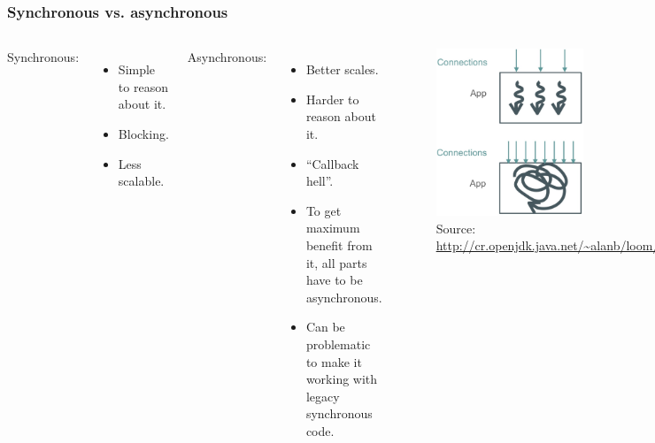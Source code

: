 \documentclass[10pt,utf8]{beamer}
\begin{document}
\begin{frame}
  \frametitle{Synchronous vs. asynchronous}
  \begin{columns}
            Synchronous:
            \begin{itemize}
                \item Simple to reason about it.
                \item Blocking.
                \item Less scalable.
            \end{itemize}
            
            \vspace{0.5cm}
            
            Asynchronous:
            \begin{itemize}
                \item Better scales.
                \item Harder to reason about it.
                \item ``Callback hell''.
                \item To get maximum benefit from it, all parts have to be asynchronous.
                \item Can be problematic to make it working with legacy synchronous code.
            \end{itemize}
            
            \begin{figure}
                \centering
                \includegraphics[height=5cm]{./img/sync_vs_async.eps}
                \caption{\tiny{Source: \url{http://cr.openjdk.java.net/~alanb/loom/Devoxx2018.pdf}}}
            \end{figure}
    \end{columns}
\end{frame}
\end{document}
